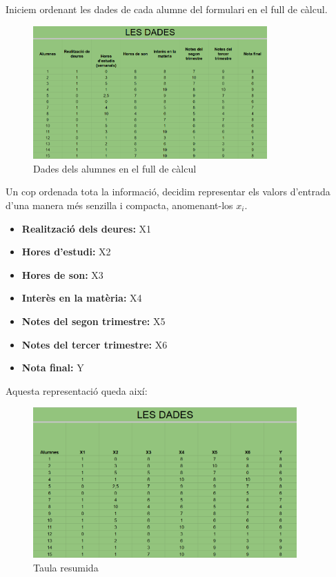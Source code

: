 Iniciem ordenant les dades de cada alumne del formulari en el full de càlcul.
\begin{figure}[H]
    \centering
    \includegraphics[width=0.8\textwidth]{./figures/Dades.png}
    \caption{Dades dels alumnes en el full de càlcul}
\end{figure}
Un cop ordenada tota la informació, decidim representar els valors d’entrada d’una manera més senzilla i compacta, anomenant-los $x_i$.
\begin{itemize}
 \item \textbf {Realització dels deures:} X1
 \item \textbf {Hores d'estudi:} X2
 \item \textbf {Hores de son:} X3
 \item \textbf {Interès en la matèria:} X4
 \item \textbf {Notes del segon trimestre:} X5
 \item \textbf {Notes del tercer trimestre:} X6
 \item \textbf {Nota final:} Y
\end{itemize}

Aquesta representació queda així:

\begin{figure}[h!]
    \centering
    \includegraphics[width=0.9\textwidth]{./figures/Dades_resumides.png}
    \caption{Taula resumida}
\end{figure}

